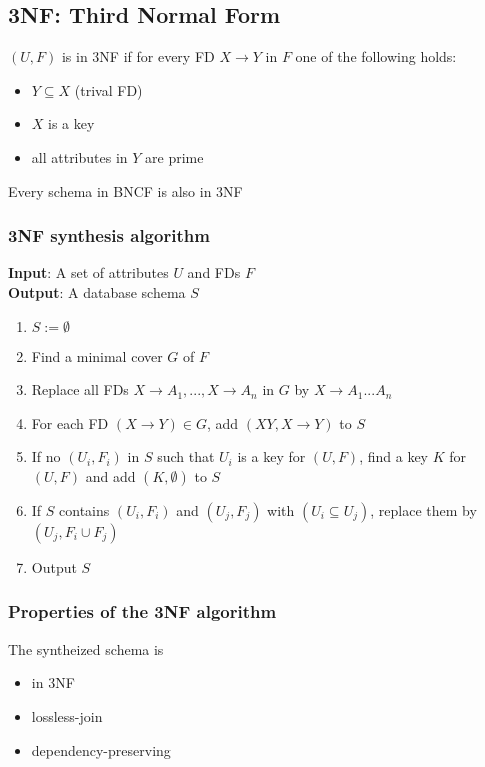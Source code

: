 \documentclass{article}
\begin{document}
\subsection{3NF: Third Normal Form}

$(U,F)$ is in 3NF if for every FD $X \rightarrow Y$ in $F$ one of the following holds:
\begin{itemize}
  \item $Y \subseteq X$ (trival FD)
  \item $X$ is a key
  \item all attributes in $Y$ are prime
\end{itemize}
Every schema in BNCF is also in 3NF

\subsubsection*{3NF synthesis algorithm}
\textbf{Input}: A set of attributes $U$ and FDs $F$\\
\textbf{Output}: A database schema $S$

\begin{enumerate}
  \item $S:= \emptyset$
  \item Find a minimal cover $G$ of $F$
  \item Replace all FDs $X \rightarrow A_1,..., X\rightarrow A_n$ in $G$ by $X \rightarrow A_1...A_n$
  \item For each FD $(X\rightarrow Y) \in G$, add $(XY,X\rightarrow Y)$ to $S$
  \item If no $(U_i,F_i)$ in $S$ such that $U_i$ is a key for $(U,F)$, find a key $K$ for $(U,F)$ and add $(K,\emptyset)$ to $S$
  \item If $S$ contains $(U_i,F_i)$ and $(U_j,F_j)$ with $(U_i \subseteq U_j)$, replace them by $(U_j,F_i\cup F_j)$
  \item Output $S$
\end{enumerate}

\subsubsection*{Properties of the 3NF algorithm}
The syntheized schema is
\begin{itemize}
  \item in 3NF
  \item lossless-join
  \item dependency-preserving
\end{itemize}
\end{document}

